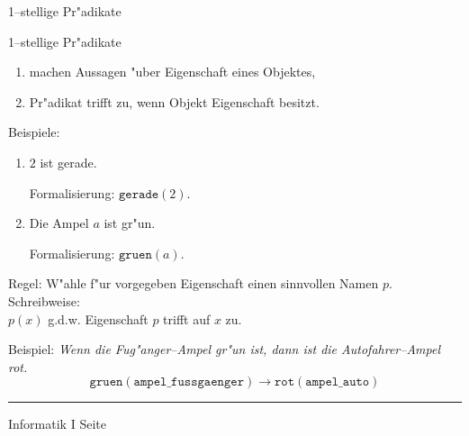 \begin{slide}{}
\normalsize
\begin{center}
1--stellige Pr"adikate
\end{center}
\vspace{0.5cm}

\footnotesize
1--stellige Pr"adikate
\begin{enumerate}
\item machen Aussagen "uber  Eigenschaft eines  Objektes,
\item Pr"adikat trifft zu, wenn Objekt Eigenschaft besitzt.
\end{enumerate}

Beispiele:
\begin{enumerate}
\item $2$ ist gerade.

      Formalisierung: $\mathtt{gerade}(2)$.
\item Die Ampel $a$ ist gr"un.

      Formalisierung: $\mathtt{gruen}(a)$.
\end{enumerate}
Regel: W"ahle f"ur vorgegeben Eigenschaft einen sinnvollen Namen $p$.  
Schreibweise: \\[0.3cm]
\hspace*{1.3cm} 
$p(x)$ g.d.w. Eigenschaft $p$ trifft auf $x$ zu.

Beispiel: {\em Wenn die Fu\3g"anger--Ampel gr"un ist, dann ist die 
Autofahrer--Ampel rot.}
$$ \mathtt{gruen}(\mathtt{ampel\_fussgaenger}) \rightarrow 
   \mathtt{rot}(\mathtt{ampel\_auto}) $$

\vspace*{\fill}
\tiny \addtocounter{mypage}{1}
\rule{15cm}{1mm}
Informatik I  \hspace*{\fill} Seite 
\end{slide}


